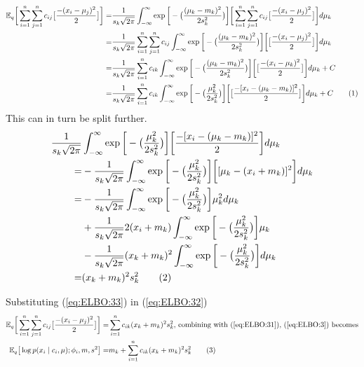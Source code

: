 \documentclass[]{article}
\newcommand{\Expectation} {\mathbb{E}}
\newcommand\numberthis    {\addtocounter{equation}{1}\tag{\theequation}}
\begin{document}
\begin{align*}
\Expectation_q\bigg[\sum_{i=1}^{n}\sum_{j=1}^{n} c_{ij}\big[\frac{-(x_i-\mu_j)^2}{2}\big]\bigg]=&\frac{1}{s_k\sqrt{2\pi}} \int_{-\infty}^{\infty} \exp{\bigg[-\big(\frac{(\mu_k-m_k)^2}{2 s_k^2}\big)\bigg]}\bigg[\sum_{i=1}^{n}\sum_{j=1}^{n} c_{ij}\big[\frac{-(x_i-\mu_j)^2}{2}\big]\bigg] d \mu_k\\
=&\frac{1}{s_k\sqrt{2\pi}} \sum_{i=1}^{n}\sum_{j=1}^{n} c_{ij} \int_{-\infty}^{\infty} \exp{\bigg[-\big(\frac{(\mu_k-m_k)^2}{2 s_k^2}\big)\bigg]}\bigg[\big[\frac{-(x_i-\mu_j)^2}{2}\big]\bigg] d \mu_k\\
=&\frac{1}{s_k\sqrt{2\pi}} \sum_{i=1}^{n} c_{ik} \int_{-\infty}^{\infty} \exp{\bigg[-\big(\frac{(\mu_k-m_k)^2}{2 s_k^2}\big)\bigg]}\bigg[\big[\frac{-(x_i-\mu_k)^2}{2}\big]\bigg] d \mu_k + C\\
=&\frac{1}{s_k\sqrt{2\pi}} \sum_{i=1}^{n} c_{ik} \int_{-\infty}^{\infty} \exp{\bigg[-\big(\frac{\mu_k^2}{2 s_k^2}\big)\bigg]}\bigg[\big[\frac{-[x_i-(\mu_k-m_k)]^2}{2}\big]\bigg] d \mu_k + C \numberthis \label{eq:ELBO:32}
\end{align*}
This can in turn be split further. 
\begin{align*}
	\frac{1}{s_k\sqrt{2\pi}}& \int_{-\infty}^{\infty} \exp{\bigg[-\big(\frac{\mu_k^2}{2 s_k^2}\big)\bigg]}\bigg[\frac{-[x_i-(\mu_k-m_k)]^2}{2}\bigg] d \mu_k\\
	=&-\frac{1}{s_k\sqrt{2\pi}} \int_{-\infty}^{\infty} \exp{\bigg[-\big(\frac{\mu_k^2}{2 s_k^2}\big)\bigg]}\bigg[[\mu_k-(x_i+m_k)]^2\bigg] d \mu_k\\
	=& -\frac{1}{s_k\sqrt{2\pi}} \int_{-\infty}^{\infty} \exp{\bigg[-\big(\frac{\mu_k^2}{2 s_k^2}\big)\bigg]} \mu_k^2 d\mu_k\\
	 &+ \frac{1}{s_k\sqrt{2\pi}} 2(x_i+m_k) \int_{-\infty}^{\infty} \exp{\bigg[-\big(\frac{\mu_k^2}{2 s_k^2}\big)\bigg]} \mu_k\\
	 &-\frac{1}{s_k\sqrt{2\pi}} (x_k+m_k)^2 \int_{-\infty}^{\infty} \exp{\bigg[-\big(\frac{\mu_k^2}{2 s_k^2}\big)\bigg]} d \mu_k\\
	 =& (x_k+m_k)^2 s_k^2 \numberthis \label{eq:ELBO:33}
\end{align*}

Substituting (\ref{eq:ELBO:33}) in (\ref{eq:ELBO:32})
\begin{align*}
	\Expectation_q\bigg[\sum_{i=1}^{n}\sum_{j=1}^{n} c_{ij}\big[\frac{-(x_i-\mu_j)^2}{2}\big]\bigg]=& \sum_{i=1}^{n} c_{ik} (x_k+m_k)^2 s_k^2 \text{, combining with (\ref{eq:ELBO:31}), (\ref{eq:ELBO:3}) becomes}\\
	\Expectation_q\big[\log{p(x_i\mid c_i,\mu);\phi_i,m,s^2}\big] =& m_k + \sum_{i=1}^{n} c_{ik} (x_k+m_k)^2 s_k^2 \numberthis \label{eq:ELBO:3F}	
\end{align*}
\end{document}
